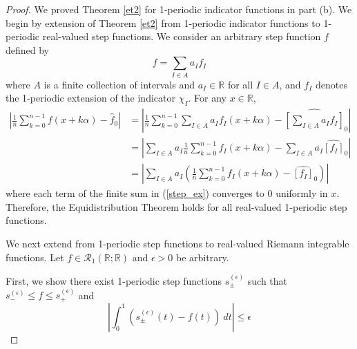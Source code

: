 \documentclass[12pt, reqno]{amsart}
\theoremstyle{definition}
\theoremstyle{remark}
\begin{document}
\begin{itemize}
\begin{itemize}
\begin{proof}
    
We proved Theorem \ref{et2} for 1-periodic indicator functions in part (b). We begin by extension of Theorem \ref{et2} from 1-periodic indicator functions to 1-periodic real-valued step functions. We consider an arbitrary step function $f$ defined by $$f=\sum_{I\in A}a_{I}f_{I}$$where $A$ is a finite collection of intervals and $a_{I}\in\mathbb{R}$ for all $I\in A$, and $f_{I}$ denotes the 1-periodic extension of the indicator $\chi_{I}$. For any $x\in \mathbb{R}$,
\begin{align}
    \left| \frac{1}{n}\sum_{k=0}^{n-1}f(x+k\alpha)-\hat{f}_0\right|&= \left| \frac{1}{n}\sum_{k=0}^{n-1}\sum_{I\in A}a_{I}f_{I}(x+k \alpha)-\widehat{\left[\sum_{I\in A}a_{I}f_{I}\right]}_{0}\right|\\
    &= \left| \sum_{I\in A}a_{I} \frac{1}{n}\sum_{k=0}^{n-1}f_{I}(x+k \alpha)-\sum_{I\in A}a_{I}\widehat{\left[f_{I}\right]}_{0}\right|\\
&= \left| \sum_{I\in A}a_{I} \left(\frac{1}{n}\sum_{k=0}^{n-1}f_{I}(x+k \alpha)-\widehat{\left[f_{I}\right]}_{0}\right)\right| \label{step_ex}
\end{align}
where each term of the finite sum in (\ref{step_ex}) converges to 0 uniformly in $x$. Therefore, the Equidistribution Theorem holds for all real-valued 1-periodic step functions.

\vspace*{10 pt}
We next extend from 1-periodic step functions to real-valued Riemann integrable functions. Let $f\in\mathcal{R}_1(\mathbb{R;R})$ and $\epsilon>0$ be arbitrary. 


\vspace*{10 pt}

First, we show there exist 1-periodic step functions $s_{\pm}^{(\epsilon)}$ such that $s^{(\epsilon)}_{-}\le f\le s_{+}^{(\epsilon)}$ and 
\begin{equation} \label{s_bound}
    \left|\int_{0}^{1} \left(s_{\pm}^{(\epsilon)}(t)-f(t)\right)\ dt\right|\le \epsilon
\end{equation}

\vspace*{10 pt}


\end{proof}
\end{itemize}
\end{itemize}
\end{document}
